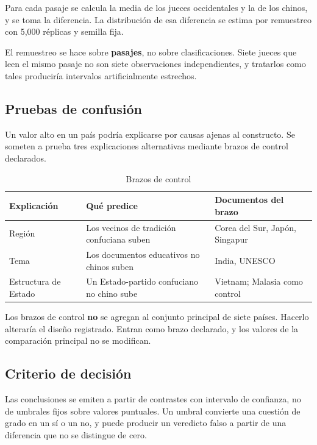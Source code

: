 \documentclass[12pt,letterpaper]{article}
\begin{document}
Para cada pasaje se calcula la media de los jueces occidentales y la de los chinos, y se toma la diferencia. La distribución de esa diferencia se estima por remuestreo con 5{,}000 réplicas y semilla fija.

El remuestreo se hace sobre \textbf{pasajes}, no sobre clasificaciones. Siete jueces que leen el mismo pasaje no son siete observaciones independientes, y tratarlos como tales produciría intervalos artificialmente estrechos.

\subsection{Pruebas de confusión}

Un valor alto en un país podría explicarse por causas ajenas al constructo. Se someten a prueba tres explicaciones alternativas mediante brazos de control declarados.

\begin{table}[htbp]
\centering
\small
\caption{Brazos de control}
\begin{tabular}{@{}p{3cm}p{5.2cm}p{5.2cm}@{}}
\toprule
\textbf{Explicación} & \textbf{Qué predice} & \textbf{Documentos del brazo} \\
\midrule
Región & Los vecinos de tradición confuciana suben & Corea del Sur, Japón, Singapur \\
Tema & Los documentos educativos no chinos suben & India, UNESCO \\
Estructura de Estado & Un Estado-partido confuciano no chino sube & Vietnam; Malasia como control \\
\bottomrule
\end{tabular}
\end{table}

Los brazos de control \textbf{no} se agregan al conjunto principal de siete países. Hacerlo alteraría el diseño registrado. Entran como brazo declarado, y los valores de la comparación principal no se modifican.

\subsection{Criterio de decisión}

Las conclusiones se emiten a partir de contrastes con intervalo de confianza, no de umbrales fijos sobre valores puntuales. Un umbral convierte una cuestión de grado en un sí o un no, y puede producir un veredicto falso a partir de una diferencia que no se distingue de cero.
\end{document}
